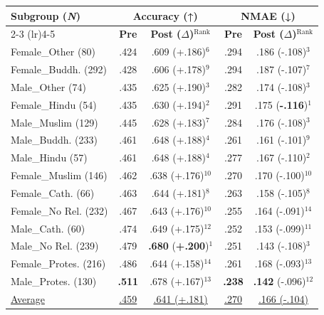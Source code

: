 \begin{tabular}{@{} p{2.7cm} | c c | c c @{}}
\toprule
\multirow{2}{*}{\textbf{Subgroup (\textbf{\textit{N}})}} & \multicolumn{2}{c|}{\textbf{Accuracy (↑)}} & \multicolumn{2}{c}{\textbf{NMAE (↓)}} \\
\cmidrule(lr){2-3} \cmidrule(lr){4-5}
& \textbf{Pre} & \textbf{Post ($\Delta$)}$^{\text{Rank}}$ & \textbf{Pre} & \textbf{Post ($\Delta$)}$^{\text{Rank}}$ \\
\midrule
Female\_Other (80) & .424 & .609 (+.186)$^{6}$ & .294 & .186 (-.108)$^{3}$ \\
Female\_Buddh. (292) & .428 & .606 (+.178)$^{9}$ & .294 & .187 (-.107)$^{7}$ \\
Male\_Other (74) & .435 & .625 (+.190)$^{3}$ & .282 & .174 (-.108)$^{3}$ \\
Female\_Hindu (54) & .435 & .630 (+.194)$^{2}$ & .291 & .175 (\textbf{-.116})$^{1}$ \\
Male\_Muslim (129) & .445 & .628 (+.183)$^{7}$ & .284 & .176 (-.108)$^{3}$ \\
Male\_Buddh. (233) & .461 & .648 (+.188)$^{4}$ & .261 & .161 (-.101)$^{9}$ \\
Male\_Hindu (57) & .461 & .648 (+.188)$^{4}$ & .277 & .167 (-.110)$^{2}$ \\
Female\_Muslim (146) & .462 & .638 (+.176)$^{10}$ & .270 & .170 (-.100)$^{10}$ \\
Female\_Cath. (66) & .463 & .644 (+.181)$^{8}$ & .263 & .158 (-.105)$^{8}$ \\
Female\_No Rel. (232) & .467 & .643 (+.176)$^{10}$ & .255 & .164 (-.091)$^{14}$ \\
Male\_Cath. (60) & .474 & .649 (+.175)$^{12}$ & .252 & .153 (-.099)$^{11}$ \\
Male\_No Rel. (239) & .479 & \textbf{.680} (\textbf{+.200})$^{1}$ & .251 & .143 (-.108)$^{3}$ \\
Female\_Protes. (216) & .486 & .644 (+.158)$^{14}$ & .261 & .168 (-.093)$^{13}$ \\
Male\_Protes. (130) & \textbf{.511} & .678 (+.167)$^{13}$ & \textbf{.238} & \textbf{.142} (-.096)$^{12}$ \\
\midrule
\underline{Average} & \underline{.459} & \underline{.641 (+.181)} & \underline{.270} & \underline{.166 (-.104)} \\
\bottomrule
\end{tabular}
